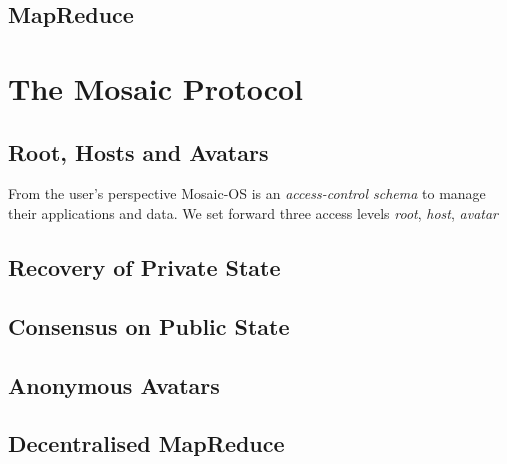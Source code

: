 \documentclass[twoside,twocolumn]{article}
\begin{document}
\subsection{MapReduce}


\section{The Mosaic Protocol}

\subsection{Root, Hosts and Avatars}

From the user's perspective Mosaic-OS is an \emph{access-control schema} to manage their applications and data.
We set forward three access levels \emph{root}, \emph{host}, \emph{avatar}

\subsection{Recovery of Private State}

\subsection{Consensus on Public State}

\subsection{Anonymous Avatars}

\subsection{Decentralised MapReduce}



\theendnotes


\begin{thebibliography}{99} %

 
\end{thebibliography}

\end{document}
